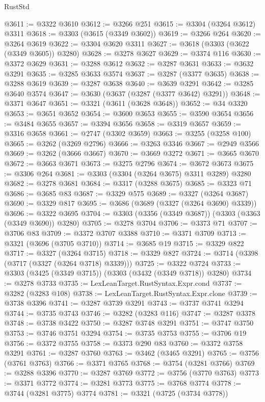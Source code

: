\begin{lexlean}{RustStd}
\begin{coremodule}
@3611 := @3322 @3610
@3612 := @3266 @251
@3615 := @3304 (@3264 @3612) @3311
@3618 := @3303 (@3615 (@3349 @3602))
@3619 := @3266 @264
@3620 := @3264 @3619
@3622 := @3304 @3620 @3311
@3627 := @3618 (@3303 (@3622 (@3349 @3605)) @3280)
@3628 := @3278 @3627
@3629 := @3374 @116
@3630 := @3372 @3629
@3631 := @3288 @3612
@3632 := @3287 @3631
@3633 := @3632 @3291
@3635 := @3285 @3633 @3574
@3637 := @3287 (@3377 @3635)
@3638 := @3288 @3619
@3639 := @3287 @3638
@3640 := @3639 @3291
@3642 := @3285 @3640 @3574
@3647 := @3630 (@3637 (@3287 (@3377 @3642) @3291))
@3648 := @3371 @3647
@3651 := @3321 (@3611 (@3628 @3648))
@3652 := @34 @3320
@3653 := @3651 @3652
@3654 := @3600 @3653
@3655 := @3590 @3654
@3656 := @3484 @3655
@3657 := @3394 @3656
@3658 := @3319 @3657
@3659 := @3316 @3658
@3661 := @2747 (@3302 @3659)
@3663 := @3255 (@3258 @100)
@3665 := @3262 (@3269 @2796)
@3666 := @3263 @3346
@3667 := @2949 @3566
@3669 := @3262 (@3666 @3667)
@3670 := @3669 @3272
@3671 := @3665 @3670
@3672 := @3663 @3671
@3673 := @3275 @2796
@3674 := @3672 @3673
@3675 := @3306 @264
@3681 := @3303 (@3304 (@3264 @3675) @3311 @3289) @3280
@3682 := @3278 @3681
@3684 := @3317 (@3288 @3675)
@3685 := @3323 @71
@3686 := @3685 @83
@3687 := @3329 @575
@3689 := @3327 (@3264 @3687)
@3690 := @3329 @817
@3695 := @3686 (@3689 (@3327 (@3264 @3690) @3339))
@3696 := @3322 @3695
@3704 := @3303 (@3356 (@3349 @3687)) (@3303 (@3363 (@3349 @3690)) @3280)
@3705 := @3278 @3704
@3706 := @3373 @71
@3707 := @3706 @83
@3709 := @3372 @3707 @3388
@3710 := @3371 @3709
@3713 := @3321 (@3696 (@3705 @3710))
@3714 := @3685 @19
@3715 := @3329 @822
@3717 := @3327 (@3264 @3715)
@3718 := @3329 @827
@3724 := @3714 (@3398 (@3717 (@3327 (@3264 @3718) @3339)))
@3725 := @3322 @3724
@3733 := @3303 (@3425 (@3349 @3715)) (@3303 (@3432 (@3349 @3718)) @3280)
@3734 := @3278 @3733
@3735 := LexLeanTarget.RustSyntax.Expr.cond
@3737 := @3282 (@3283 @108)
@3738 := LexLeanTarget.RustSyntax.Expr.clone
@3739 := @3738 @3396
@3741 := @3287 @3739 @3291
@3743 := @3737 @3741 @3294
@3744 := @3735 @3743
@3746 := @3282 (@3283 @116)
@3747 := @3287 @3378
@3748 := @3738 @3422
@3750 := @3287 @3748 @3291
@3751 := @3747 @3750
@3753 := @3746 @3751 @3294
@3754 := @3735 @3753
@3755 := @3706 @19
@3756 := @3372 @3755
@3758 := @3373 @290 @83
@3760 := @3372 @3758 @3291
@3761 := @3287 @3760
@3763 := @3462 (@3465 @3291)
@3765 := @3756 (@3761 @3763)
@3766 := @3371 @3765
@3768 := @3754 (@3281 @3766)
@3769 := @3288 @3396
@3770 := @3287 @3769
@3772 := @3756 (@3770 @3763)
@3773 := @3371 @3772
@3774 := @3281 @3773
@3775 := @3768 @3774
@3778 := @3744 (@3281 @3775) @3774
@3781 := @3321 (@3725 (@3734 @3778))

\end{coremodule}
\end{lexlean}
